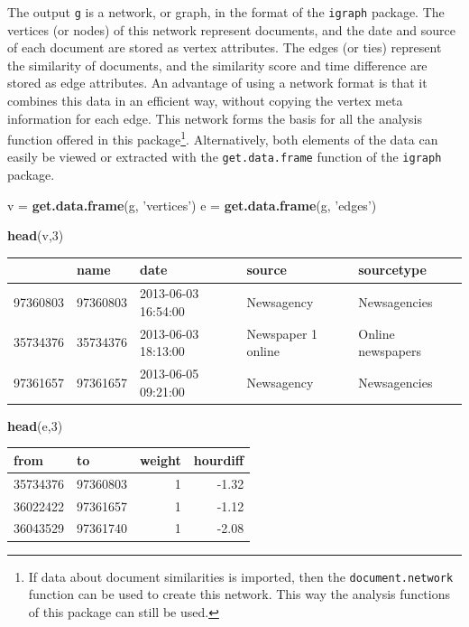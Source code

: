 \documentclass[]{article}
\newenvironment{Shaded}{\begin{snugshade}}{\end{snugshade}}
\newcommand{\KeywordTok}[1]{\textcolor[rgb]{0.13,0.29,0.53}{\textbf{{#1}}}}
\newcommand{\DecValTok}[1]{\textcolor[rgb]{0.00,0.00,0.81}{{#1}}}
\newcommand{\StringTok}[1]{\textcolor[rgb]{0.31,0.60,0.02}{{#1}}}
\newcommand{\NormalTok}[1]{{#1}}
\let\rmarkdownfootnote\footnote%
\def\footnote{\protect\rmarkdownfootnote}
\begin{document}
The output \texttt{g} is a network, or graph, in the format of the
\texttt{igraph} package. The vertices (or nodes) of this network
represent documents, and the date and source of each document are stored
as vertex attributes. The edges (or ties) represent the similarity of
documents, and the similarity score and time difference are stored as
edge attributes. An advantage of using a network format is that it
combines this data in an efficient way, without copying the vertex meta
information for each edge. This network forms the basis for all the
analysis function offered in this package\footnote{If data about
  document similarities is imported, then the \texttt{document.network}
  function can be used to create this network. This way the analysis
  functions of this package can still be used.}. Alternatively, both
elements of the data can easily be viewed or extracted with the
\texttt{get.data.frame} function of the \texttt{igraph} package.

\begin{Shaded}
\begin{Highlighting}[]
\NormalTok{v =}\StringTok{ }\KeywordTok{get.data.frame}\NormalTok{(g, }\StringTok{'vertices'}\NormalTok{)}
\NormalTok{e =}\StringTok{ }\KeywordTok{get.data.frame}\NormalTok{(g, }\StringTok{'edges'}\NormalTok{)}

\KeywordTok{head}\NormalTok{(v,}\DecValTok{3}\NormalTok{)}
\end{Highlighting}
\end{Shaded}

\begin{longtable}[c]{@{}lllll@{}}
\toprule
& name & date & source & sourcetype\tabularnewline
\midrule
\endhead
97360803 & 97360803 & 2013-06-03 16:54:00 & Newsagency &
Newsagencies\tabularnewline
35734376 & 35734376 & 2013-06-03 18:13:00 & Newspaper 1 online & Online
newspapers\tabularnewline
97361657 & 97361657 & 2013-06-05 09:21:00 & Newsagency &
Newsagencies\tabularnewline
\bottomrule
\end{longtable}

\begin{Shaded}
\begin{Highlighting}[]
\KeywordTok{head}\NormalTok{(e,}\DecValTok{3}\NormalTok{)                   }
\end{Highlighting}
\end{Shaded}

\begin{longtable}[c]{@{}llrr@{}}
\toprule
from & to & weight & hourdiff\tabularnewline
\midrule
\endhead
35734376 & 97360803 & 1 & -1.32\tabularnewline
36022422 & 97361657 & 1 & -1.12\tabularnewline
36043529 & 97361740 & 1 & -2.08\tabularnewline
\bottomrule
\end{longtable}
\end{document}
